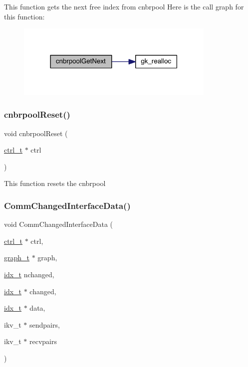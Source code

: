 This function gets the next free index from cnbrpool Here is the call graph for this function\+:\nopagebreak
\begin{figure}[H]
\begin{center}
\leavevmode
\includegraphics[width=270pt]{a00951_a5c7982f300512c943ce53a0531529ae8_cgraph}
\end{center}
\end{figure}
\mbox{\label{a00951_ab24df9968589b0cfabb8f1a8b4661d0d}} 
\subsubsection{\texorpdfstring{cnbrpool\+Reset()}{cnbrpoolReset()}}
{\footnotesize\ttfamily void cnbrpool\+Reset (\begin{DoxyParamCaption}\item[{\hyperlink{a00742}{ctrl\+\_\+t} $\ast$}]{ctrl }\end{DoxyParamCaption})}

This function resets the cnbrpool \mbox{\label{a00951_adc12fed8c165f50572b6704789b0a962}} 
\subsubsection{\texorpdfstring{Comm\+Changed\+Interface\+Data()}{CommChangedInterfaceData()}}
{\footnotesize\ttfamily void Comm\+Changed\+Interface\+Data (\begin{DoxyParamCaption}\item[{\hyperlink{a00742}{ctrl\+\_\+t} $\ast$}]{ctrl,  }\item[{\hyperlink{a00734}{graph\+\_\+t} $\ast$}]{graph,  }\item[{\hyperlink{a00876_aaa5262be3e700770163401acb0150f52}{idx\+\_\+t}}]{nchanged,  }\item[{\hyperlink{a00876_aaa5262be3e700770163401acb0150f52}{idx\+\_\+t} $\ast$}]{changed,  }\item[{\hyperlink{a00876_aaa5262be3e700770163401acb0150f52}{idx\+\_\+t} $\ast$}]{data,  }\item[{ikv\+\_\+t $\ast$}]{sendpairs,  }\item[{ikv\+\_\+t $\ast$}]{recvpairs }\end{DoxyParamCaption})}

